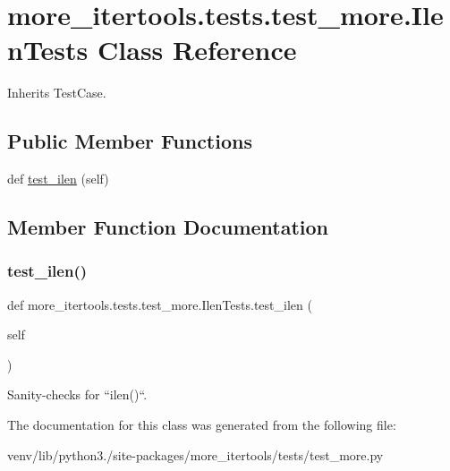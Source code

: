 \hypertarget{classmore__itertools_1_1tests_1_1test__more_1_1_ilen_tests}{}\section{more\+\_\+itertools.\+tests.\+test\+\_\+more.\+Ilen\+Tests Class Reference}
\label{classmore__itertools_1_1tests_1_1test__more_1_1_ilen_tests}


Inherits Test\+Case.

\subsection*{Public Member Functions}
\begin{DoxyCompactItemize}
\item 
def \hyperlink{classmore__itertools_1_1tests_1_1test__more_1_1_ilen_tests_a46dfb34fec59dedb94d4a7214a093c72}{test\+\_\+ilen} (self)
\end{DoxyCompactItemize}


\subsection{Member Function Documentation}
\mbox{\label{classmore__itertools_1_1tests_1_1test__more_1_1_ilen_tests_a46dfb34fec59dedb94d4a7214a093c72}} 
\subsubsection{\texorpdfstring{test\+\_\+ilen()}{test\_ilen()}}
{\footnotesize\ttfamily def more\+\_\+itertools.\+tests.\+test\+\_\+more.\+Ilen\+Tests.\+test\+\_\+ilen (\begin{DoxyParamCaption}\item[{}]{self }\end{DoxyParamCaption})}

\begin{DoxyVerb}Sanity-checks for ``ilen()``.\end{DoxyVerb}
 

The documentation for this class was generated from the following file\+:\begin{DoxyCompactItemize}
\item 
venv/lib/python3./site-\/packages/more\+\_\+itertools/tests/test\+\_\+more.\+py\end{DoxyCompactItemize}
